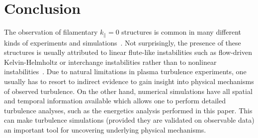 \documentclass[showpacs,preprintnumbers,amsmath,amssymb,superscriptaddress,aip]{revtex4-1}
\def\para{\parallel}
\begin{document}
%
%


\section{Conclusion}
\label{conclusion}

The observation of filamentary $k_\para = 0$ structures is common in many different kinds of experiments and simulations~\cite{rogers2010,kamataki2007}. 
Not surprisingly, the presence of these structures is usually attributed to linear flute-like instabilities such as flow-driven Kelvin-Helmholtz or interchange instabilities rather than to 
nonlinear instabilities~\cite{rogers2010,kamataki2007}.
Due to natural limitations in plasma turbulence experiments, one usually has to resort to indirect evidence to 
gain insight into physical mechanisms of observed turbulence. 
On the other hand, numerical simulations have all spatial and temporal information available which allows one to perform detailed turbulence analyses, such as the energetics analysis
performed in this paper. 
This can make turbulence simulations (provided they are validated on observable data) an important tool for uncovering underlying physical mechanisms.
\end{document}
